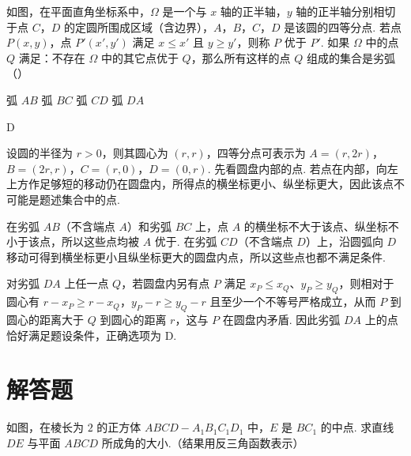 \begin{problem}
如图，在平面直角坐标系中，\(\Omega\) 是一个与 \(x\) 轴的正半轴，\(y\) 轴的正半轴分别相切于点 \(C\)，\(D\) 的定圆所围成区域（含边界），\(A\)，\(B\)，\(C\)，\(D\) 是该圆的四等分点. 若点 \(P(x, y)\)，点 \(P'(x', y')\) 满足 \(x \leqslant x'\) 且 \(y \geqslant y'\)，则称 \(P\) 优于 \(P'\). 如果 \(\Omega\) 中的点 \(Q\) 满足：不存在 \(\Omega\) 中的其它点优于 \(Q\)，那么所有这样的点 \(Q\) 组成的集合是劣弧（\quad）

\FloatBarrier

\choices
    {弧 \(AB\)}
    {弧 \(BC\)}
    {弧 \(CD\)}
    {弧 \(DA\)}
\end{problem}

\begin{answer}
D
\end{answer}

\begin{solution}
设圆的半径为 \(r>0\)，则其圆心为 \((r,r)\)，四等分点可表示为
\(A=(r,2r)\)，\(B=(2r,r)\)，\(C=(r,0)\)，\(D=(0,r)\).
先看圆盘内部的点. 若点在内部，向左上方作足够短的移动仍在圆盘内，所得点的横坐标更小、纵坐标更大，因此该点不可能是题述集合中的点.

在劣弧 \(AB\)（不含端点 \(A\)）和劣弧 \(BC\) 上，点 \(A\) 的横坐标不大于该点、纵坐标不小于该点，所以这些点均被 \(A\) 优于. 在劣弧 \(CD\)（不含端点 \(D\)）上，沿圆弧向 \(D\) 移动可得到横坐标更小且纵坐标更大的圆盘内点，所以这些点也都不满足条件.

对劣弧 \(DA\) 上任一点 \(Q\)，若圆盘内另有点 \(P\) 满足 \(x_P\leqslant x_Q\)、\(y_P\geqslant y_Q\)，则相对于圆心有
\(r-x_P\geqslant r-x_Q\)，\(y_P-r\geqslant y_Q-r\)
且至少一个不等号严格成立，从而 \(P\) 到圆心的距离大于 \(Q\) 到圆心的距离 \(r\)，这与 \(P\) 在圆盘内矛盾. 因此劣弧 \(DA\) 上的点恰好满足题设条件，正确选项为 D.
\end{solution}

\section{解答题}

\begin{problem}
如图，在棱长为 \(2\) 的正方体 \(ABCD-A_1B_1C_1D_1\) 中，\(E\) 是 \(BC_1\) 的中点. 求直线 \(DE\) 与平面 \(ABCD\) 所成角的大小.（结果用反三角函数表示）

\FloatBarrier
\end{problem}


